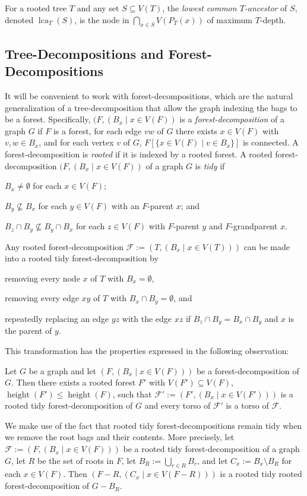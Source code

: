 \documentclass{patmorin}
\renewcommand{\le}{\leqslant}
\newcommand{\defin}[1]{\emph{\textcolor{brightmaroon}{#1}}}
\DeclareMathOperator{\height}{height}
\DeclareMathOperator{\lca}{lca}
\begin{document}
For a rooted tree $T$ and any set $S\subseteq V(T)$, the \defin{lowest common $T$-ancestor} of $S$, denoted \defin{$\lca_T(S)$}, is the node in $\bigcap_{x\in S} V(P_T(x))$ of maximum $T$-depth.

\subsection{Tree-Decompositions and Forest-Decompositions}

It will be convenient to work with forest-decompositions, which are the natural generalization of a tree-decomposition that allow the graph indexing the bags to be a forest.  Specifically, $(F,(B_x\mid x\in V(F))$ is a \defin{forest-decomposition} of a graph $G$ if $F$ is a forest, for each edge $vw$ of $G$ there exists $x\in V(F)$ with $v,w\in B_x$, and for each vertex $v$ of $G$, $F[\{x\in V(F)\mid v\in B_x\}]$ is connected.  A forest-decomposition is \defin{rooted} if it is indexed by a rooted forest.  A rooted forest-decomposition $(F,(B_x\mid x\in V(F))$ of a graph $G$ is \defin{tidy} if
\begin{enumerate*}[label=(\arabic*)]
  \item $B_x\neq\emptyset$ for each $x\in V(F)$;
  \item $B_y\not\subseteq B_x$ for each $y\in V(F)$ with an $F$-parent $x$; and
  \item $B_z \cap B_y \not\subseteq B_y\cap B_x$ for each $z\in V(F)$ with $F$-parent $y$ and $F$-grandparent $x$.
\end{enumerate*}
Any rooted forest-decomposition $\mathcal{F}:=(T,(B_x\mid x\in V(T)))$ can be made into a rooted tidy forest-decomposition by
\begin{enumerate*}[label=(\arabic*)]
  \item removing every node $x$ of $T$ with $B_x=\emptyset$,
  \item removing every edge $xy$ of $T$ with $B_x\cap B_y=\emptyset$, and
  \item repeatedly replacing an edge $yz$ with the edge $xz$ if $B_z\cap B_y=B_x\cap B_y$ and $x$ is the parent of $y$.
\end{enumerate*} This transformation has the properties expressed in the following observation:
\begin{obs}\label{tidy_forest}
  Let $G$ be a graph and let $(F,(B_x\mid x\in V(F)))$ be a forest-decomposition of $G$. Then there exists a rooted forest $F'$ with $V(F')\subseteq V(F)$, $\height(F')\le\height(F)$, such that $\mathcal{F}':=(F',(B_x\mid x\in V(F')))$ is a rooted tidy forest-decomposition of $G$ and every torso of $\mathcal{F}'$ is a torso of $\mathcal{F}$.
\end{obs}
We make use of the fact that rooted tidy forest-decompositions remain tidy when we remove the root bags and their contents.  More precisely, let $\mathcal{F}:=(F,(B_x\mid x\in V(F)))$ be a rooted tidy forest-decomposition of a graph $G$, let $R$ be the set of roots in $F$, let $B_R:=\bigcup_{r\in R}B_r$, and let $C_x:=B_x\setminus B_R$ for each $x\in V(F)$.  Then $(F-R,(C_x\mid x\in V(F-R)))$ is a rooted tidy rooted forest-decomposition of $G-B_R$.
\end{document}
